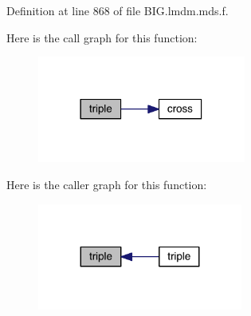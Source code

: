 Definition at line 868 of file B\+I\+G.\+lmdm.\+mds.\+f.



Here is the call graph for this function\+:\nopagebreak
\begin{figure}[H]
\begin{center}
\leavevmode
\includegraphics[width=194pt]{_b_i_g_8lmdm_8mds_8f_a4f0dc28bb4bc5945b250816796a6393c_cgraph}
\end{center}
\end{figure}




Here is the caller graph for this function\+:\nopagebreak
\begin{figure}[H]
\begin{center}
\leavevmode
\includegraphics[width=191pt]{_b_i_g_8lmdm_8mds_8f_a4f0dc28bb4bc5945b250816796a6393c_icgraph}
\end{center}
\end{figure}


